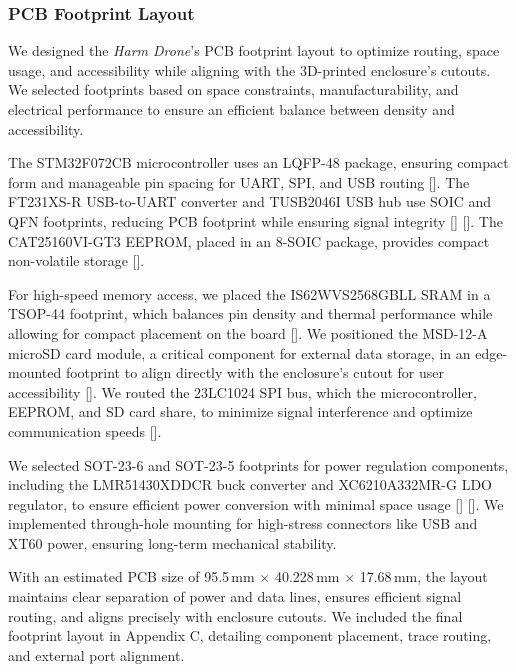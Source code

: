 \documentclass[12pt]{article}
\begin{document}
\subsubsection{PCB Footprint Layout}

\par We designed the \textit{Harm Drone}’s PCB footprint layout to optimize routing, space usage, and accessibility while aligning with the 3D-printed enclosure’s cutouts. We selected footprints based on space constraints, manufacturability, and electrical performance to ensure an efficient balance between density and accessibility.

\par The STM32F072CB microcontroller uses an LQFP-48 package, ensuring compact form and manageable pin spacing for UART, SPI, and USB routing []. The FT231XS-R USB-to-UART converter and TUSB2046I USB hub use SOIC and QFN footprints, reducing PCB footprint while ensuring signal integrity [] []. The CAT25160VI-GT3 EEPROM, placed in an 8-SOIC package, provides compact non-volatile storage [].

\par For high-speed memory access, we placed the IS62WVS2568GBLL SRAM in a TSOP-44 footprint, which balances pin density and thermal performance while allowing for compact placement on the board []. We positioned the MSD-12-A microSD card module, a critical component for external data storage, in an edge-mounted footprint to align directly with the enclosure’s cutout for user accessibility []. We routed the 23LC1024 SPI bus, which the microcontroller, EEPROM, and SD card share, to minimize signal interference and optimize communication speeds [].

\par We selected SOT-23-6 and SOT-23-5 footprints for power regulation components, including the LMR51430XDDCR buck converter and XC6210A332MR-G LDO regulator, to ensure efficient power conversion with minimal space usage [] []. We implemented through-hole mounting for high-stress connectors like USB and XT60 power, ensuring long-term mechanical stability.

\par With an estimated PCB size of 95.5\,mm $\times$ 40.228\,mm $\times$ 17.68\,mm, the layout maintains clear separation of power and data lines, ensures efficient signal routing, and aligns precisely with enclosure cutouts. We included the final footprint layout in Appendix C, detailing component placement, trace routing, and external port alignment.
\end{document}
